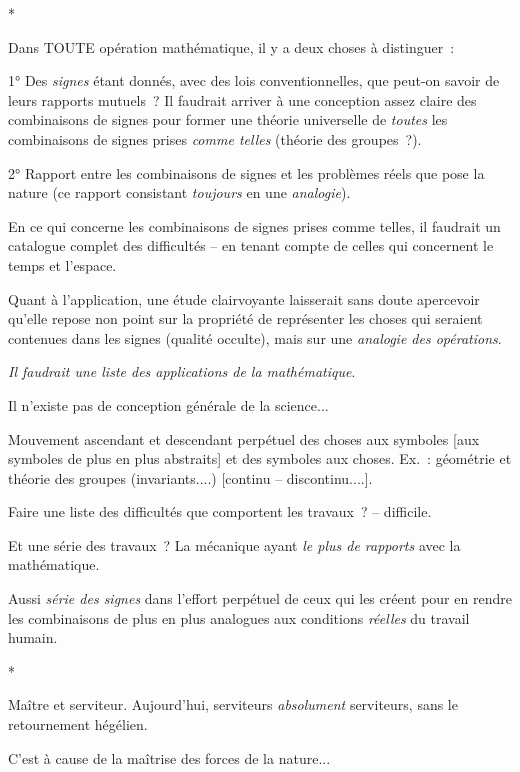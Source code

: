 \documentclass[french,twoside]{book} %
\begin{document}
\begin{center}
*\end{center}
\noindent Dans TOUTE opération mathématique, il y a deux choses à distinguer :\par
1° Des {\itshape signes} étant donnés, avec des lois conventionnelles, que peut-on savoir de leurs rapports mutuels ? Il faudrait arriver à une conception assez claire des combinaisons de signes pour former une théorie universelle de {\itshape toutes} les combinaisons de signes prises {\itshape comme telles} (théorie des groupes ?).\par
2° Rapport entre les combinaisons de signes et les problèmes réels que pose la nature (ce rapport consistant {\itshape toujours} en une {\itshape analogie}).\par
\par
En ce qui concerne les combinaisons de signes prises comme telles, il faudrait un catalogue complet des difficultés – en tenant compte de celles qui concernent le temps et l'espace.\par
Quant à l'application, une étude clairvoyante laisserait sans doute apercevoir qu'elle repose non point sur la propriété de représenter les choses qui seraient contenues dans les signes (qualité occulte), mais sur une {\itshape analogie des opérations}.\par
{\itshape Il faudrait une liste des applications de la mathématique}.\par
Il n'existe pas de conception générale de la science...\par
Mouvement ascendant et descendant perpétuel des choses aux symboles [aux symboles de plus en plus abstraits] et des symboles aux choses. Ex. : géométrie et théorie des groupes (invariants....) [continu – discontinu....].\par
Faire une liste des difficultés que comportent les travaux ? – difficile.\par
Et une série des travaux ? La mécanique ayant {\itshape le plus de rapports} avec la mathématique.\par
Aussi {\itshape série des signes} dans l'effort perpétuel de ceux qui les créent pour en rendre les combinaisons de plus en plus analogues aux conditions {\itshape réelles} du travail humain.\par

\begin{center}
*\end{center}
\noindent Maître et serviteur. Aujourd'hui, serviteurs {\itshape absolument} serviteurs, sans le retournement hégélien.\par
C'est à cause de la maîtrise des forces de la nature...\par
\end{document}
